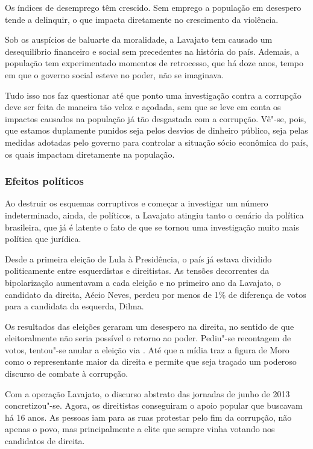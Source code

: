 Os índices de desemprego têm crescido. Sem emprego a população em
desespero tende a delinquir, o que impacta diretamente no crescimento da
violência.

Sob os auspícios de baluarte da moralidade, a Lavajato tem causado um
desequilíbrio financeiro e social sem precedentes na história do país.
Ademais, a população tem experimentado momentos de retrocesso, que há
doze anos, tempo em que o governo social esteve no poder, não se
imaginava.

Tudo isso nos faz questionar até que ponto uma investigação contra a
corrupção deve ser feita de maneira tão veloz e açodada, sem que se leve
em conta os impactos causados na população já tão desgastada com a
corrupção. Vê"-se, pois, que estamos duplamente punidos seja pelos
desvios de dinheiro público, seja pelas medidas adotadas pelo governo
para controlar a situação sócio econômica do país, os quais impactam
diretamente na população.

\subsubsection{Efeitos políticos}

Ao destruir os esquemas corruptivos e começar a investigar um número
indeterminado, ainda, de políticos, a Lavajato atingiu tanto o cenário
da política brasileira, que já é latente o fato de que se tornou uma
investigação muito mais política que jurídica.

Desde a primeira eleição de Lula à Presidência, o país já estava
dividido politicamente entre esquerdistas e direitistas. As tensões
decorrentes da bipolarização aumentavam a cada eleição e no primeiro ano
da Lavajato, o candidato da direita, Aécio Neves, perdeu por menos de
1\% de diferença de votos para a candidata da esquerda, Dilma.

Os resultados das eleições geraram um desespero na direita, no sentido
de que eleitoralmente não seria possível o retorno ao poder. Pediu"-se
recontagem de votos, tentou"-se anular a eleição via . Até que a mídia
traz a figura de Moro como o representante maior da direita e permite
que seja traçado um poderoso discurso de combate à corrupção.

Com a operação Lavajato, o discurso abstrato das jornadas de junho de
2013 concretizou"-se. Agora, os direitistas conseguiram o apoio popular
que buscavam há 16 anos. As pessoas iam para as ruas protestar pelo fim
da corrupção, não apenas o povo, mas principalmente a elite que sempre
vinha votando nos candidatos de direita.

